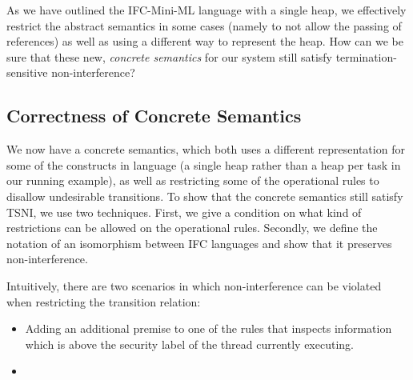 
As we have outlined the IFC-Mini-ML language with a single heap, we
effectively restrict the abstract semantics in some cases (namely
to not allow the passing of references) as well as using a different
way to represent the heap.  How can we be sure that these
new, \textit{concrete semantics} for our system still satisfy
termination-sensitive non-interference?


\subsection{Correctness of Concrete Semantics}

We now have a concrete semantics, which both uses a different
representation for some of the constructs in language (a single
heap rather than a heap per task in our running example), as well
as restricting some of the operational rules to disallow
undesirable transitions.  To show that the concrete semantics
still satisfy TSNI, we use two techniques.  First, we give a
condition on what kind of restrictions can be allowed on the
operational rules.  Secondly, we define the notation of an
isomorphism between IFC languages and show that it preserves
non-interference.

Intuitively, there are two scenarios in which non-interference
can be violated when restricting the transition relation:
\begin{itemize}
  \item Adding an additional premise to one of the rules that inspects
  information which is above the security label of the thread currently
  executing.
  \item
\end{itemize}


